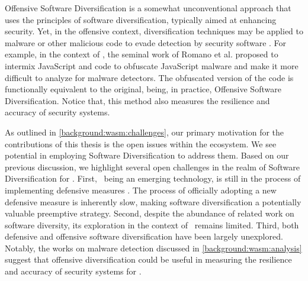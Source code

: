 Offensive Software Diversification is a somewhat unconventional approach that uses the principles of software diversification, typically aimed at enhancing security.
Yet, in the offensive context, diversification techniques may be applied to malware or other malicious code to evade detection by security software \cite{8714698}.
For example, in the context of \wasm, the seminal work of Romano et al.  \cite{wobfuscator} proposed to intermix JavaScript and \wasm code to obfuscate JavaScript malware and make it more difficult to analyze for malware detectors.
The obfuscated version of the code is functionally equivalent to the original, being, in practice, Offensive Software Diversification.
Notice that, this method also measures the resilience and accuracy of security systems.


\label{sota:openchallenges}
As outlined in \autoref{background:wasm:challenges}, our primary motivation for the contributions of this thesis is the open issues within the \Wasm ecosystem. 
We see potential in employing Software Diversification to address them. 
Based on our previous discussion, we highlight several open challenges in the realm of Software Diversification for \Wasm. 
First, \wasm\, being an emerging technology, is still in the process of implementing defensive measures \cite{Stevienart paper here}. 
The process of officially adopting a new defensive measure is inherently slow, making software diversification a potentially valuable preemptive strategy. 
Second, despite the abundance of related work on software diversity, its exploration in the context of \wasm\ remains limited. 
Third, both defensive and offensive software diversification have been largely unexplored. 
Notably, the works on malware detection discussed in \autoref{background:wasm:analysis} suggest that offensive diversification could be useful in measuring the resilience and accuracy of security systems for \Wasm.






